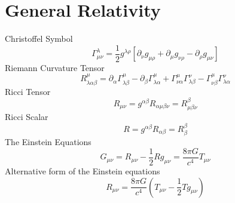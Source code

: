 \documentclass[11pt]{cuthesis}
\newcommand{\mn}{_{\mu\nu}}
\begin{document}
\appendix
\appendixpage
\addappheadtotoc
\chapter{General Relativity} \label{appendix:gr}

Christoffel Symbol
\begin{equation} \label{christ}
\Gamma^\lambda\mn=\frac{1}{2}g^{\lambda \rho} [\partial_\nu g_{\mu \rho} + \partial_\mu g_{\nu \rho}-\partial_\rho g\mn]
\end{equation}
Riemann Curvature Tensor  
\begin{equation} \label{rct}
R^\mu_{\lambda \alpha \beta} = \partial_\alpha \Gamma^\mu_{\lambda \beta} -\partial_\beta \Gamma^\mu_{\lambda \alpha} + \Gamma^\mu_{\nu \alpha} \Gamma^\nu_{\lambda \beta} - \Gamma^\mu_{\nu \beta} \Gamma^\nu_{\lambda \alpha}
\end{equation}
Ricci Tensor
\begin{equation} \label{rt}
R\mn=g^{\alpha \beta} R_{\alpha \mu \beta \nu}=R^\beta_{\mu \beta \nu}
\end{equation}
Ricci Scalar
\begin{equation} \label{rs}
R=g^{\alpha \beta}R_{\alpha \beta}=R^\beta_\beta
\end{equation}
The Einstein Equations
\begin{equation} \label{eineq}
G\mn =R\mn -\frac{1}{2} R g\mn=\frac{8 \pi G}{c^4}T\mn
\end{equation}
Alternative form of the Einstein equations
\begin{equation} \label{alt einstein}
R\mn = \frac{8 \pi G}{c^4}\left( T\mn - \frac{1}{2}Tg\mn \right) 
\end{equation}
\end{document}
